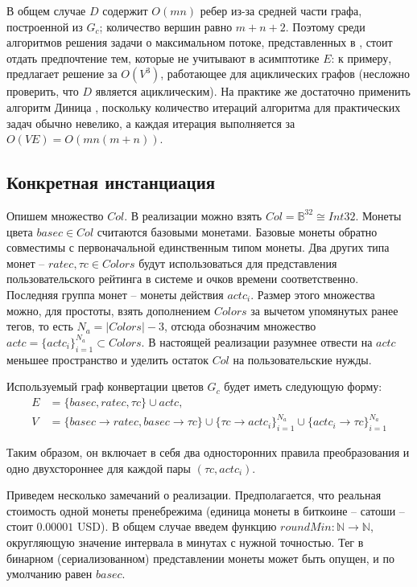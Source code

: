 \documentclass[specification,annotation]{itmo-student-thesis}
\begin{document}
В общем случае $D$ содержит $O(mn)$ ребер из-за средней части графа,
построенной из $G_c$; количество вершин равно $m+n+2$. Поэтому среди
алгоритмов решения задачи о максимальном потоке, представленных в
\cite{goldberg1988new}, стоит отдать предпочтение тем, которые не
учитывают в асимптотике $E$: к примеру, \cite{malhotra1978v}
предлагает решение за $O(V^3)$, работающее для ациклических графов
(несложно проверить, что $D$ является ациклическим). На практике же
достаточно применить алгоритм Диница \cite{dinitz2006dinitz},
поскольку количество итераций алгоритма для практических задач обычно
невелико, а каждая итерация выполняется за $O(VE) = O(mn(m+n))$.

\subsection{Конкретная инстанциация}

Опишем множество $Col$. В реализации можно взять $Col =
\mathbb{B}^{32} \cong Int32$. Монеты цвета $basec \in Col$ считаются
базовыми монетами. Базовые монеты обратно совместимы с первоначальной
единственным типом монеты. Два других типа монет -- $ratec, \tau c \in
Colors$ будут использоваться для представления пользовательского
рейтинга в системе и очков времени соответственно. Последняя группа
монет -- монеты действия $actc_i$. Размер этого множества можно, для
простоты, взять дополнением $Colors$ за вычетом упомянутых ранее
тегов, то есть $N_a = |Colors|-3$, отсюда обозначим множество $actc =
\{actc_i\}_{i=1}^{N_a} \subset Colors$. В настоящей реализации
разумнее отвести на $actc$ меньшее пространство и уделить остаток
$Col$ на пользовательские нужды.

Используемый граф конвертации цветов $G_c$ будет иметь следующую
форму:
\begin{align*}
  E &= \{basec, ratec, \tau c\} \cup actc,\\
  V &= \{basec \rightarrow ratec
  , basec \rightarrow \tau c\} \cup
  \{\tau c \rightarrow actc_i\}_{i=1}^{N_a} \cup
  \{actc_i \rightarrow \tau c\}_{i=1}^{N_a}
\end{align*}

Таким образом, он включает в себя два односторонних правила
преобразования и одно двухстороннее для каждой пары $(\tau c, actc_i)$.

Приведем несколько замечаний о реализации. Предполагается, что
реальная стоимость одной монеты пренебрежима (единица монеты в
биткоине -- сатоши -- стоит $0.00001$ USD). В общем случае введем
функцию $roundMin : \mathbb{N} \rightarrow \mathbb{N}$, округляющую
значение интервала в минутах с нужной точностью. Тег в бинарном
(сериализованном) представлении монеты может быть опущен, и по
умолчанию равен $basec$.
\end{document}

